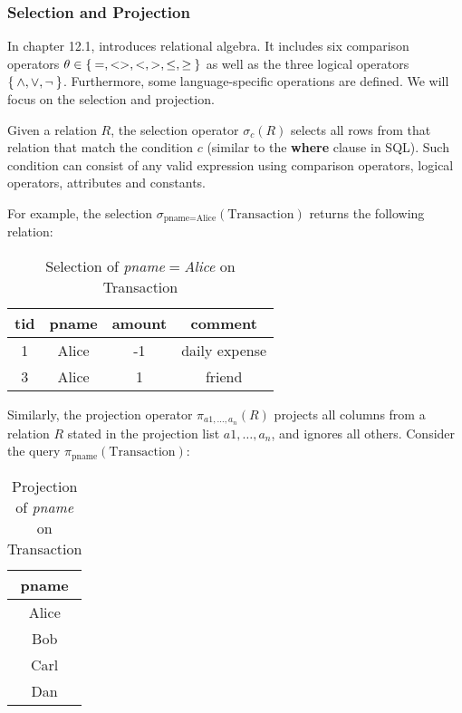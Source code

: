 \subsubsection{Selection and Projection}

In chapter 12.1, \cite{Halp08}
introduces relational algebra. It includes six
comparison operators $\theta \in \Set{=, <>, <, >, \leq, \geq}$ as well as the
three logical operators $\Set{\land, \lor, \neg}$. Furthermore, some
language-specific operations are defined. We will focus on the selection and projection.

Given a relation $R$, the selection operator $\sigma_c(R)$ selects all rows from
that relation that match the condition $c$ (similar to the \textbf{where} clause in \gls{SQL}).
Such condition can consist of any valid
expression using comparison operators, logical operators, attributes and constants.

For example, the selection $\sigma_{\text{pname}=\text{Alice}}(\text{Transaction})$
returns the following relation:

\begin{table}[H]
    \centering
    \begin{tabular}{|c|c|c|c|}
        \hline
        tid     & pname & amount    & comment \\ \hline\hline
        1       & Alice & -1        & daily expense \\ \hline
        3       & Alice & 1         & friend\\ \hline
    \end{tabular}
    \caption{Selection of \textit{pname$=$Alice} on Transaction}
    \label{Selection of pname=Alice}
\end{table}

Similarly, the projection operator $\pi_{a1, \dots, a_n}(R)$ projects all columns
from a relation $R$ stated in the projection list $a1, \dots, a_n$, and
ignores all others. Consider the query $\pi_{\text{pname}}(\text{Transaction})$:

\begin{table}[htbp]
    \centering
    \begin{tabular}{|c|}
        \hline
        pname \\ \hline\hline
        Alice \\ \hline
        Bob   \\ \hline
        Carl  \\ \hline
        Dan   \\ \hline
    \end{tabular}
    \caption{Projection of \textit{pname} on Transaction}
    \label{Projection of pname}
\end{table}

